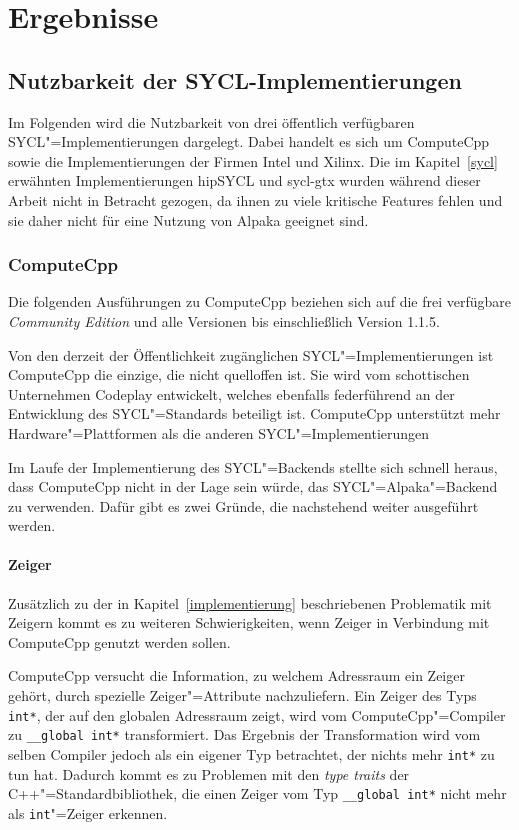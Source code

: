 \chapter{Ergebnisse}\label{ergebnisse}

\section{Nutzbarkeit der SYCL-Implementierungen}
\label{ergebnisse:nutzbarkeit}

Im Folgenden wird die Nutzbarkeit von drei öffentlich verfügbaren
SYCL"=Implementierungen dargelegt. Dabei handelt es sich um ComputeCpp sowie
die Implementierungen der Firmen Intel und Xilinx. Die im Kapitel~\ref{sycl}
erwähnten Implementierungen hipSYCL und sycl-gtx wurden während dieser Arbeit
nicht in Betracht gezogen, da ihnen zu viele kritische Features fehlen und sie
daher nicht für eine Nutzung von Alpaka geeignet sind.

\subsection{ComputeCpp}

Die folgenden Ausführungen zu ComputeCpp beziehen sich auf die frei verfügbare
\textit{Community Edition} und alle Versionen bis einschließlich Version 1.1.5.

Von den derzeit der Öffentlichkeit zugänglichen SYCL"=Implementierungen ist
ComputeCpp die einzige, die nicht quelloffen ist. Sie wird vom schottischen
Unternehmen Codeplay entwickelt, welches ebenfalls federführend an der
Entwicklung des SYCL"=Standards beteiligt ist. ComputeCpp unterstützt mehr
Hardware"=Plattformen als die anderen SYCL"=Implementierungen

Im Laufe der Implementierung des SYCL"=Backends stellte sich schnell heraus,
dass ComputeCpp nicht in der Lage sein würde, das SYCL"=Alpaka"=Backend zu
verwenden. Dafür gibt es zwei Gründe, die nachstehend weiter ausgeführt werden.

\subsubsection{Zeiger}

Zusätzlich zu der in Kapitel~\ref{implementierung} beschriebenen Problematik
mit Zeigern kommt es zu weiteren Schwierigkeiten, wenn Zeiger in Verbindung mit
ComputeCpp genutzt werden sollen.

ComputeCpp versucht die Information, zu welchem Adressraum ein Zeiger gehört,
durch spezielle Zeiger"=Attribute nachzuliefern. Ein Zeiger des Typs
\texttt{int*}, der auf den globalen Adressraum zeigt, wird vom
ComputeCpp"=Compiler zu \texttt{\_\_global int*} transformiert. Das Ergebnis der
Transformation wird vom selben Compiler jedoch als ein eigener Typ betrachtet,
der nichts mehr \texttt{int*} zu tun hat. Dadurch kommt es zu Problemen mit den
\textit{type traits} der C++"=Standardbibliothek, die einen Zeiger vom Typ
\texttt{\_\_global int*} nicht mehr als \texttt{int}"=Zeiger erkennen.

